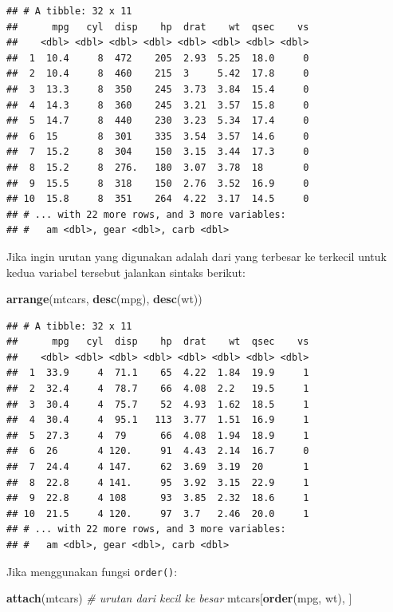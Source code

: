 \documentclass[]{book}
\newenvironment{Shaded}{\begin{snugshade}}{\end{snugshade}}
\newcommand{\KeywordTok}[1]{\textcolor[rgb]{0.13,0.29,0.53}{\textbf{#1}}}
\newcommand{\CommentTok}[1]{\textcolor[rgb]{0.56,0.35,0.01}{\textit{#1}}}
\newcommand{\NormalTok}[1]{#1}
\begin{document}
\begin{verbatim}
## # A tibble: 32 x 11
##      mpg   cyl  disp    hp  drat    wt  qsec    vs
##    <dbl> <dbl> <dbl> <dbl> <dbl> <dbl> <dbl> <dbl>
##  1  10.4     8  472    205  2.93  5.25  18.0     0
##  2  10.4     8  460    215  3     5.42  17.8     0
##  3  13.3     8  350    245  3.73  3.84  15.4     0
##  4  14.3     8  360    245  3.21  3.57  15.8     0
##  5  14.7     8  440    230  3.23  5.34  17.4     0
##  6  15       8  301    335  3.54  3.57  14.6     0
##  7  15.2     8  304    150  3.15  3.44  17.3     0
##  8  15.2     8  276.   180  3.07  3.78  18       0
##  9  15.5     8  318    150  2.76  3.52  16.9     0
## 10  15.8     8  351    264  4.22  3.17  14.5     0
## # ... with 22 more rows, and 3 more variables:
## #   am <dbl>, gear <dbl>, carb <dbl>
\end{verbatim}

Jika ingin urutan yang digunakan adalah dari yang terbesar ke terkecil
untuk kedua variabel tersebut jalankan sintaks berikut:

\begin{Shaded}
\begin{Highlighting}[]
\KeywordTok{arrange}\NormalTok{(mtcars, }\KeywordTok{desc}\NormalTok{(mpg), }\KeywordTok{desc}\NormalTok{(wt))}
\end{Highlighting}
\end{Shaded}

\begin{verbatim}
## # A tibble: 32 x 11
##      mpg   cyl  disp    hp  drat    wt  qsec    vs
##    <dbl> <dbl> <dbl> <dbl> <dbl> <dbl> <dbl> <dbl>
##  1  33.9     4  71.1    65  4.22  1.84  19.9     1
##  2  32.4     4  78.7    66  4.08  2.2   19.5     1
##  3  30.4     4  75.7    52  4.93  1.62  18.5     1
##  4  30.4     4  95.1   113  3.77  1.51  16.9     1
##  5  27.3     4  79      66  4.08  1.94  18.9     1
##  6  26       4 120.     91  4.43  2.14  16.7     0
##  7  24.4     4 147.     62  3.69  3.19  20       1
##  8  22.8     4 141.     95  3.92  3.15  22.9     1
##  9  22.8     4 108      93  3.85  2.32  18.6     1
## 10  21.5     4 120.     97  3.7   2.46  20.0     1
## # ... with 22 more rows, and 3 more variables:
## #   am <dbl>, gear <dbl>, carb <dbl>
\end{verbatim}

Jika menggunakan fungsi \texttt{order()}:

\begin{Shaded}
\begin{Highlighting}[]
\KeywordTok{attach}\NormalTok{(mtcars)}
\CommentTok{# urutan dari kecil ke besar}
\NormalTok{mtcars[}\KeywordTok{order}\NormalTok{(mpg, wt), ]}
\end{Highlighting}
\end{Shaded}
\end{document}
